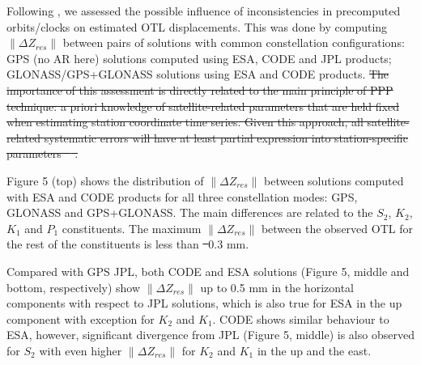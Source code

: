 \documentclass[se, manuscript]{copernicus}
\providecommand{\DIFadd}[1]{{\protect\color{blue}\uwave{#1}}} %
\providecommand{\DIFdel}[1]{{\protect\color{red}\sout{#1}}}                      %
\providecommand{\DIFaddbegin}{} %
\providecommand{\DIFaddend}{} %
\providecommand{\DIFdelbegin}{} %
\providecommand{\DIFdelend}{} %
\begin{document}
Following \cite{Yuan2013}, we assessed the possible influence of inconsistencies in precomputed orbits/clocks on estimated OTL displacements. This was done by computing $\|\Delta Z_{res}\|$ between pairs of solutions with common constellation configurations: GPS (no AR here) solutions computed using ESA, CODE and JPL products; GLONASS/GPS+GLONASS solutions using ESA and CODE products. \DIFdelbegin \DIFdel{The importance of this assessment is directly related to the main principle of PPP technique: a priori knowledge of satellite-related parameters that are held fixed when estimating station coordinate time series. Given this approach, all satellite-related systematic errors will have at least partial expression into station-specific parameters \mbox{%
\citep{Yuan2013}}\hspace{0pt}%
.
}%

\DIFdelend Figure 5 (top) shows the distribution of $\|\Delta Z_{res}\|$ between solutions computed with ESA and CODE products for all three constellation modes: GPS, GLONASS and GPS+GLONASS. The main differences are related to the $S_2$, $K_2$, $K_1$ and $P_1$ constituents. The maximum $\|\Delta Z_{res}\|$ between the observed OTL for the rest of the constituents is less than \DIFdelbegin \DIFdel{~}\DIFdelend \DIFaddbegin \DIFadd{$\sim$}\DIFaddend 0.3 mm.

Compared with GPS JPL, both CODE and ESA solutions (Figure 5, middle and bottom, respectively) show $\|\Delta Z_{res}\|$ up to 0.5 mm in the horizontal components with respect to JPL solutions, which is also true for ESA in the up component with exception for $K_2$ and $K_1$. CODE shows similar behaviour to ESA, however, significant divergence from JPL (Figure 5, middle) is also observed for $S_2$ with even higher $\|\Delta Z_{res}\|$ for $K_2$ and $K_1$ in the up and the east.
\end{document}
